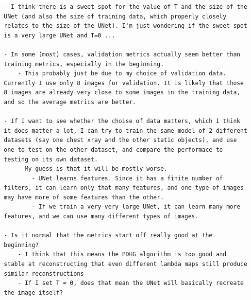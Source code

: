 \documentclass[12pt]{article}
\begin{document}
\begin{verbatim}
- I think there is a sweet spot for the value of T and the size of the UNet (and also the size of training data, which properly closely relates to the size of the UNet). I'm just wondering if the sweet spot is a very large UNet and T=0 ...

- In some (most) cases, validation metrics actually seem better than training metrics, especially in the beginning.
    - This probably just be due to my choice of validation data. Currently I use only 8 images for validation. It is likely that those 8 images are already very close to some images in the training data, and so the average metrics are better.

- If I want to see whether the choise of data matters, which I think it does matter a lot, I can try to train the same model of 2 different datasets (say one chest xray and the other static objects), and use one to test on the other dataset, and compare the performace to testing on its own dataset.
    - My guess is that it will be mostly worse.
        - UNet learns features. Since it has a finite number of filters, it can learn only that many features, and one type of images may have more of some features than the other.
        - If we train a very very large UNet, it can learn many more features, and we can use many different types of images.

- Is it normal that the metrics start off really good at the beginning?
    - I think that this means the PDHG algorithm is too good and stable at reconstructing that even different lambda maps still produce similar reconstructions
    - If I set T = 0, does that mean the UNet will basically recreate the image itself?


\end{verbatim}
\end{document}
